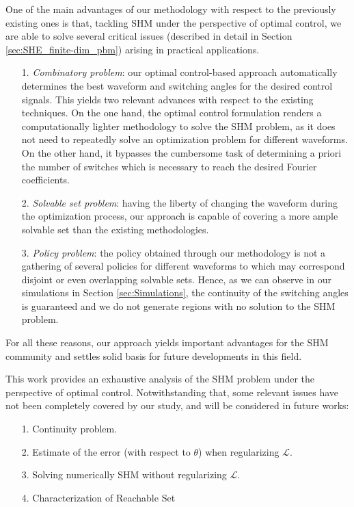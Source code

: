 \documentclass[twocolumn]{autart}    %
\begin{document}
One of the main advantages of our methodology with respect to the previously existing ones is that, tackling SHM under the perspective of optimal control, we are able to solve several critical issues (described in detail in Section \ref{sec:SHE_finite-dim_pbm}) arising in practical applications. 
\begin{itemize}
	\item[1.]  \textit{Combinatory problem}: our optimal control-based approach automatically determines the best waveform and switching angles for the desired control signals. This yields two relevant advances with respect to the existing techniques. On the one hand, the optimal control formulation renders a computationally lighter methodology to solve the SHM problem, as it does not need to repeatedly solve an optimization problem for different waveforms. On the other hand, it bypasses the cumbersome task of determining a priori the number of switches which is necessary to reach the desired Fourier coefficients.
	
	\item[2.] \textit{Solvable set problem}: having the liberty of changing the waveform during the optimization process, our approach is capable of covering a more ample solvable set than the existing methodologies. 
		
	\item[3.] \textit{Policy problem}: the policy obtained through our methodology is not a gathering of several policies for different waveforms to which may correspond disjoint or even overlapping solvable sets. Hence, as we can observe in our simulations in Section \ref{sec:Simulations}, 
	the continuity of the switching angles is guaranteed and we do not generate regions with no solution to the SHM problem.
\end{itemize}
For all these reasons, our approach yields important advantages for the SHM community and settles solid basis for future developments in this field.

This work provides an exhaustive analysis of the SHM problem under the perspective of optimal control. Notwithstanding that, some relevant issues have not been completely covered by our study, and will be considered in future works:
\begin{itemize}
	\item[1.] Continuity problem.
	\item[2.] Estimate of the error (with respect to $\theta$) when regularizing $\mathcal L$.
	\item[3.] Solving numerically SHM without regularizing $\mathcal L$.
	\item[4.] Characterization of Reachable Set
\end{itemize}
\end{document}
